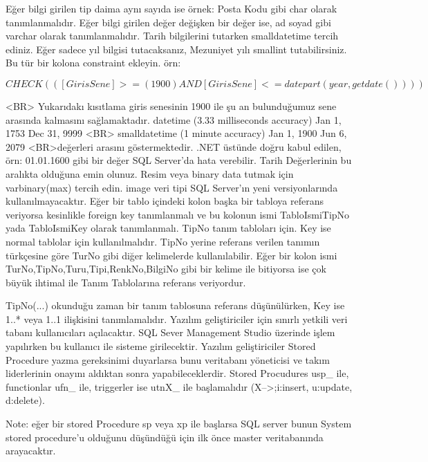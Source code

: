 \documentclass[10pt,a4paper,draft]{article}
\begin{document}
 Eğer bilgi girilen tip daima aynı sayıda ise örnek: Posta Kodu gibi 
  char olarak tanımlanmalıdır.		 
  			Eğer bilgi girilen değer değişken bir değer ise, ad soyad gibi varchar 
  olarak tanımlanmalıdır.		 
  			Tarih bilgilerini tutarken smalldatetime tercih ediniz. 			
  Eğer sadece 
  yıl bilgisi tutacaksanız, Mezuniyet yılı smallint tutabilirsiniz. Bu tür bir 
  kolona constraint ekleyin.			örn: 
  
  $  CHECK  (([GirisSene]>=(1900) AND   [GirisSene]<=datepart(year,getdate()))) $
  
  			 <BR>			Yukarıdakı kısıtlama 
  giris senesinin 1900 ile şu an bulunduğumuz sene arasında kalmasını 
  sağlamaktadır.								 
  				datetime (3.33 milliseconds accuracy)  	Jan 1, 1753  	Dec 31, 9999
  				 <BR>				smalldatetime (1 minute accuracy) 	Jan 1, 1900 	Jun 6, 2079		
  				 <BR>değerleri arasını göstermektedir. .NET üstünde doğru kabul edilen, 
  örn: 01.01.1600 gibi bir değer SQL Server'da				hata verebilir. Tarih 
  Değerlerinin bu aralıkta olduğuna emin olunuz.						 
  			Resim veya binary data tutmak için varbinary(max) tercih edin. image 
  veri tipi SQL Server'ın yeni versiyonlarında			kullanılmayacaktır.		 
  			Eğer bir tablo içindeki kolon başka bir tabloya referans veriyorsa 
  kesinlikle foreign key tanımlanmalı ve bu			kolonun ismi TabloIsmiTipNo yada 
  TabloIsmiKey olarak tanımlanmalı. TipNo tanım tabloları için. Key ise normal 
  tablolar			için kullanılmalıdır.	
    TipNo yerine referans verilen tanımın türkçesine göre TurNo
    gibi diğer kelimelerde kullanılabilir.
    Eğer bir kolon ismi TurNo,TipNo,Turu,Tipi,RenkNo,BilgiNo
    gibi bir kelime ile bitiyorsa ise çok büyük ihtimal ile
    Tanım Tablolarına referans veriyordur.
    

  
  			TipNo(...) okunduğu zaman bir tanım tablosuna referans düşünülürken, Key ise 
  1..* veya 1..1 ilişkisini tanımlamalıdır.		 
  			Yazılım geliştiriciler için sınırlı yetkili veri tabanı kullanıcıları 
  açılacaktır. SQL Sever Management Studio üzerinde işlem			yapılırken bu 
  kullanıcı ile sisteme girilecektir.		 
  			Yazılım geliştiriciler Stored Procedure yazma gereksinimi duyarlarsa 
  bunu veritabanı yöneticisi ve takım liderlerinin onayını			 aldıktan sonra 
  yapabileceklerdir.		 
  			Stored Procudures usp\_ ile, functionlar ufn\_ ile, triggerler ise 
  utnX\_ ile başlamalıdır (X-->;i:insert, u:update, d:delete). 			
  
  
  Note: eğer bir 
  stored Procedure sp veya xp ile başlarsa SQL server 			bunun System stored 
  procedure'u olduğunu düşündüğü için ilk önce master veritabanında arayacaktır. 
  
\end{document}
